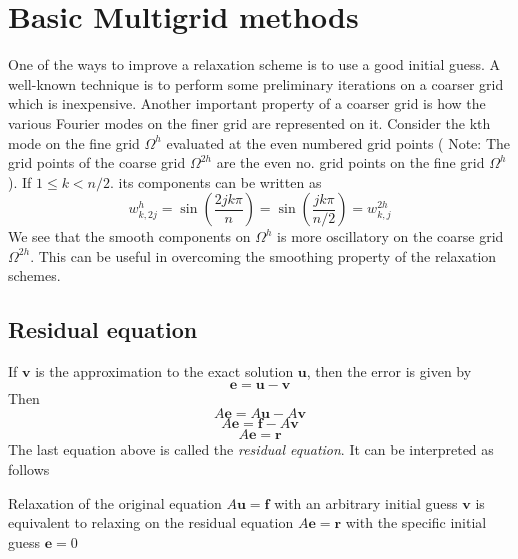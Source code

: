 \documentclass[a4paper]{report}
\begin{document}
	
	\section{Basic Multigrid methods}
	One of the ways to improve a relaxation scheme is to use a good initial guess. A well-known technique is to perform some preliminary iterations on a coarser grid which is inexpensive. 
	Another important property of a coarser grid is how the various Fourier modes on the finer grid are represented on it. 
	Consider the kth mode  on the fine grid $\Omega^h$ evaluated at the even numbered grid points ( Note: The grid points of the coarse grid $\Omega^{2h}$ are the even no. grid points on the fine grid $\Omega^h$ ). If $1\leq k<n/2$. its components can be written as
	$$
	w^h_{k,2j} = \sin \left( \frac{2jk\pi}{n} \right) =
	\sin \left( \frac{jk\pi}{n/2} \right) = w^{2h}_{k,j}
	$$
	We see that the smooth components on $\Omega^h$ is more oscillatory on the coarse grid $\Omega^{2h}$. This can be useful in overcoming the smoothing property of the relaxation schemes.
	
	\subsection{Residual equation}
	If $\mathbf{v}$ is the approximation to the exact solution $\mathbf{u}$, then the error is given by
	$$ \mathbf{e} = \mathbf{u} - \mathbf{v}$$ 
	Then
	$$ A\mathbf{e} = A\mathbf{u} - A\mathbf{v}$$
	$$ A\mathbf{e} = \mathbf{f} - A\mathbf{v}$$
	\begin{equation}
	A\mathbf{e} = \mathbf{r}
	\end{equation}
	The last equation above is called the \textit{residual equation}. It can be interpreted as follows
	
	Relaxation of the original equation $A\mathbf{u}=\mathbf{f}$ with an arbitrary initial guess $\mathbf{v}$ is equivalent to relaxing on the residual equation $A\mathbf{e} = \mathbf{r}$ with the specific initial guess $\mathbf{e} = 0$ 
	
\end{document}
